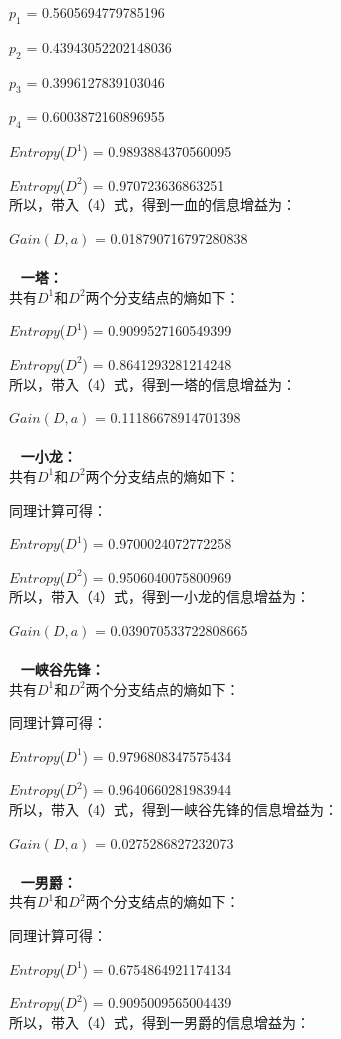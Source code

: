 \documentclass[lang=cn,11pt]{elegantpaper}
\begin{document}
$p_1$ = 0.5605694779785196

$p_2$ = 0.43943052202148036

$p_3$ = 0.3996127839103046

$p_4$ = 0.6003872160896955

$Entropy$($D^1$) = 0.9893884370560095

$Entropy$($D^2$) = 0.970723636863251\\
\quad 所以，带入（4）式，得到一血的信息增益为：

$Gain(D,a)$ = 0.018790716797280838
\\~
\\~
\textbf{一塔：}\\
\quad 共有$D^1$和$D^2$两个分支结点的熵如下：

$Entropy$($D^1$) = 0.9099527160549399

$Entropy$($D^2$) = 0.8641293281214248\\
\quad 所以，带入（4）式，得到一塔的信息增益为：

$Gain(D,a)$ = 0.11186678914701398
\\~
\\~
\textbf{一小龙：}\\
\quad 共有$D^1$和$D^2$两个分支结点的熵如下：

同理计算可得：

$Entropy$($D^1$) = 0.9700024072772258

$Entropy$($D^2$) = 0.9506040075800969\\
\quad 所以，带入（4）式，得到一小龙的信息增益为：

$Gain(D,a)$ = 0.039070533722808665
\\~
\\~
\textbf{一峡谷先锋：}\\
\quad 共有$D^1$和$D^2$两个分支结点的熵如下：

同理计算可得：

$Entropy$($D^1$) = 0.9796808347575434

$Entropy$($D^2$) = 0.9640660281983944\\
\quad 所以，带入（4）式，得到一峡谷先锋的信息增益为：

$Gain(D,a)$ = 0.0275286827232073
\\~
\\~
\textbf{一男爵：}\\
\quad 共有$D^1$和$D^2$两个分支结点的熵如下：

同理计算可得：

$Entropy$($D^1$) = 0.6754864921174134

$Entropy$($D^2$) = 0.9095009565004439\\
\quad 所以，带入（4）式，得到一男爵的信息增益为：
\end{document}
